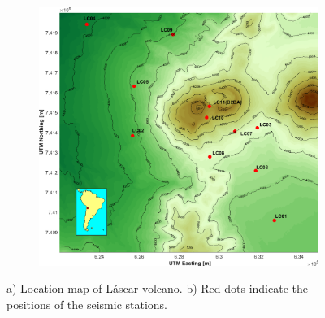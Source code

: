 \documentclass[journal]{IEEEtran}
\begin{document}
\begin{figure}
\begin{subfigure}{0.27\textwidth}
    \caption{} \label{fig:lascar_location}
  \end{subfigure}%
  \hspace*{\fill}   %
  \begin{subfigure}{0.71\textwidth}
    \footnotesize
    \includegraphics[width=\linewidth]{img/lascar_estaciones.png}
    \caption{} \label{fig:lascar:estations}
  \end{subfigure}%
\caption{a) Location map of Láscar volcano. b) Red dots indicate the positions of the seismic stations.}
\label{fig:lascar_map}
\end{figure}
\end{document}
